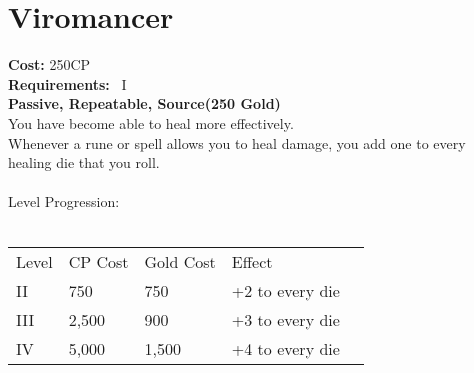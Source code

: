\section{Viromancer}\label{perk:viromancer}
\textbf{Cost:} 250CP\\
\textbf{Requirements:}~ I\\
\textbf{Passive, Repeatable, Source(250 Gold)}\\
You have become able to heal more effectively.\\
Whenever a rune or spell allows you to heal damage, you add one to every healing die that you roll.\\
\\
Level Progression:\\
\\
\begin{tabular}{l | l | l | l | l}
    Level & CP Cost & Gold Cost &  Effect\\
    II & 750 & 750 & +2 to every die\\
    III & 2,500 & 900 & +3 to every die\\
    IV & 5,000 & 1,500 & +4 to every die\\
\end{tabular}